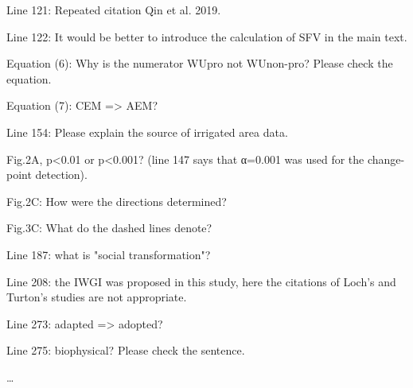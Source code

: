 \RC{} Line 121: Repeated citation Qin et al. 2019.

\RC{} Line 122: It would be better to introduce the calculation of SFV in the main text.

\RC{} Equation (6): Why is the numerator WUpro not WUnon-pro? Please check the equation.

\RC{} Equation (7): CEM => AEM?

\RC{} Line 154: Please explain the source of irrigated area data.

\RC{} Fig.2A, p<0.01 or p<0.001? (line 147 says that α=0.001 was used for the change-point detection).

\RC{} Fig.2C: How were the directions determined?

\RC{} Fig.3C: What do the dashed lines denote?

\RC{} Line 187: what is "social transformation"?

\RC{} Line 208: the IWGI was proposed in this study, here the citations of Loch's and Turton's studies are not appropriate.

\RC{} Line 273: adapted => adopted?

\RC{} Line 275: biophysical? Please check the sentence.

\AR{} \dots
